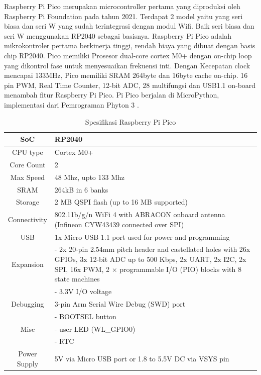 Raspberry Pi Pico merupakan microcontroller pertama yang diproduksi oleh Raspberry Pi Foundation pada tahun 2021. Terdapat 2 model
yaitu yang seri biasa dan seri W yang sudah terintegrasi dengan modul Wifi. Baik seri biasa dan seri W menggunakan RP2040 sebagai basisnya.
Raspberry Pi Pico adalah mikrokontroler pertama berkinerja tinggi, rendah biaya
yang dibuat dengan basis chip RP2040. Pico memiliki
Prosesor dual-core cortex M0+ dengan on-chip
loop yang dikontrol fase untuk menyesuaikan frekuensi inti. Dengan
Kecepatan clock mencapai 133MHz, Pico memiliki SRAM 264byte dan 16byte
cache on-chip. 16 pin PWM, Real Time Counter,
12-bit ADC, 28 multifungsi
dan USB1.1 on-board menambah fitur Raspberry Pi
Pico. Pi Pico berjalan di MicroPython, implementasi dari
Pemrograman Phyton 3 \parencite{thothadri2021analysis}.
\begin{table}[h!]
	\caption{Spesifikasi Raspberry Pi Pico}
	\centering
	\begin{tabular}{|c|p{6cm}|}
		\hline
		SoC & RP2040  \\
		\hline
		CPU type & Cortex M0+  \\
		\hline
		Core Count & 2  \\
		\hline
		Max Speed & 48 Mhz, upto 133 Mhz  \\
		\hline
		SRAM & 264kB in 6 banks  \\
		\hline
		Storage & 2 MB QSPI flash (up to 16 MB supported)  \\
		\hline
		Connectivity & 802.11b/g/n WiFi 4 with ABRACON onboard antenna (Infineon CYW43439 connected over SPI)  \\
		\hline
		USB & 1x Micro USB 1.1 port used for power and programming  \\
		\hline
		Expansion & - 2x 20-pin 2.54mm pitch header and castellated holes with 26x GPIOs, 3x 12-bit ADC up to 500 Kbps, 2x UART, 2x I2C, 2x SPI, 16x PWM, 2 × programmable I/O (PIO) blocks with 8 state machines  \\
		& - 3.3V I/O voltage  \\
		\hline
		Debugging & 3-pin Arm Serial Wire Debug (SWD) port  \\
		\hline
		& - BOOTSEL button  \\
		Misc & - user LED (WL\_GPIO0)  \\
		& - RTC  \\
		\hline
		Power Supply & 5V via Micro USB port or 1.8 to 5.5V DC via VSYS pin  \\
		\hline
	\end{tabular}
\end{table}
